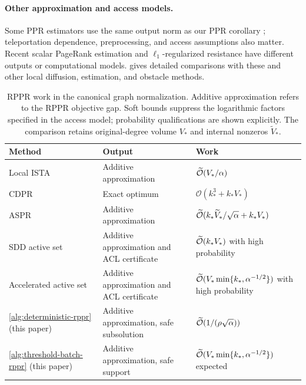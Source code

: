 \paragraph{Other approximation and access models.}
Some PPR estimators use the same output norm as our PPR corollary
\citep{wei2024absolute}; teleportation dependence, preprocessing, and access
assumptions also matter. Recent scalar PageRank estimation
\citep{thorup2026instance} and $\ell_1$-regularized resistance
\citep{li2026resistance} have different outputs or computational models.
 gives detailed comparisons with these and other
local diffusion, estimation, and obstacle methods.

\begin{table}[t]
\centering
\small
\renewcommand{\arraystretch}{1.15}
\caption{RPPR work in the canonical graph normalization. Additive
approximation refers to the RPPR objective gap. Soft bounds suppress the
logarithmic factors specified in the access model; probability qualifications
are shown explicitly. The comparison retains original-degree volume $V_*$
and internal nonzeros $\widetilde V_*$.}
\label{tab:lineage}
\begin{tabular}{@{}
 >{\raggedright\arraybackslash}p{}
 >{\raggedright\arraybackslash}p{}
 >{\raggedright\arraybackslash}p{}@{}}
\toprule
Method & Output & Work \\
\midrule
Local ISTA \citep{fountoulakis2019variational}
 & Additive approximation & $\widetilde{\mathcal{O}}(V_*/\alpha)$ \\
\midrule
CDPR \citep{martinezrubio2023accelerated}
 & Exact optimum & $\mathcal{O}(k_*^3+k_*V_*)$ \\
\midrule
ASPR \citep{martinezrubio2023accelerated}
 & Additive approximation & $\widetilde{\mathcal{O}}(k_*\widetilde V_*/\sqrt\alpha+k_*V_*)$ \\
\midrule
SDD active set \citep{wei2026simple}
 & Additive approximation and ACL certificate & $\widetilde{\mathcal{O}}(k_*V_*)$ with high probability \\
\midrule
Accelerated active set \citep{cui2026accelerating}
 & Additive approximation and ACL certificate & $\widetilde{\mathcal{O}}(V_*\min\{k_*,\alpha^{-1/2}\})$ with high probability \\
\midrule
\cref{alg:deterministic-rppr} (this paper)
 & Additive approximation, safe subsolution & $\widetilde{\mathcal{O}}(1/(\rho\sqrt\alpha))$ \\
\midrule
\cref{alg:threshold-batch-rppr} (this paper)
 & Additive approximation, safe support & $\widetilde{\mathcal{O}}(V_*\min\{k_*,\alpha^{-1/2}\})$ expected \\
\bottomrule
\end{tabular}
\end{table}

